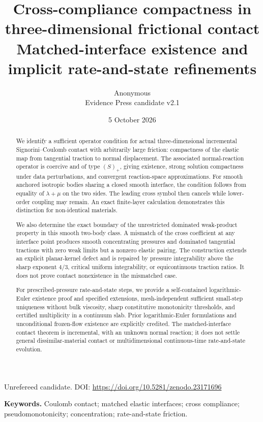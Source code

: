 \documentclass[11pt,a4paper]{article}
\title{\vspace{-13mm}\textbf{Cross-compliance compactness in\\ three-dimensional frictional contact}\\[5pt]\large Matched-interface existence and implicit rate-and-state refinements}
\author{Anonymous\\\small Evidence Press candidate v2.1}
\date{5 October 2026}
\theoremstyle{definition}\newtheorem{definition}[theorem]{Definition}
\theoremstyle{remark}\newtheorem{remark}[theorem]{Remark}
\numberwithin{equation}{section}
\begin{document}
\maketitle
\begin{center}\small Unrefereed candidate. DOI: \url{https://doi.org/10.5281/zenodo.23171696}\end{center}
\begin{abstract}
We identify a sufficient operator condition for actual three-dimensional incremental Signorini--Coulomb contact with arbitrarily large friction: compactness of the elastic map from tangential traction to normal displacement. The associated normal-reaction operator is coercive and of type $(S)_+$, giving existence, strong solution compactness under data perturbations, and convergent reaction-space approximations. For smooth anchored isotropic bodies sharing a closed smooth interface, the condition follows from equality of $\lambda+\mu$ on the two sides. The leading cross symbol then cancels while lower-order coupling may remain. An exact finite-layer calculation demonstrates this distinction for non-identical materials.

We also determine the exact boundary of the unrestricted dominated weak-product property in this smooth two-body class. A mismatch of the cross coefficient at any interface point produces smooth concentrating pressures and dominated tangential tractions with zero weak limits but a nonzero elastic pairing. The construction extends an explicit planar-kernel defect and is repaired by pressure integrability above the sharp exponent $4/3$, critical uniform integrability, or equicontinuous traction ratios. It does not prove contact nonexistence in the mismatched case.

For prescribed-pressure rate-and-state steps, we provide a self-contained logarithmic-Euler existence proof and specified extensions, mesh-independent sufficient small-step uniqueness without bulk viscosity, sharp constitutive monotonicity thresholds, and certified multiplicity in a continuum slab. Prior logarithmic-Euler formulations and unconditional frozen-flow existence are explicitly credited. The matched-interface contact theorem is incremental, with an unknown normal reaction; it does not settle general dissimilar-material contact or multidimensional continuous-time rate-and-state evolution.
\end{abstract}
\noindent\textbf{Keywords.} Coulomb contact; matched elastic interfaces; cross compliance; pseudomonotonicity; concentration; rate-and-state friction.
\clearpage
\begingroup\small\setlength{\parskip}{0pt}
\tableofcontents
\endgroup
\newpage
\end{document}

